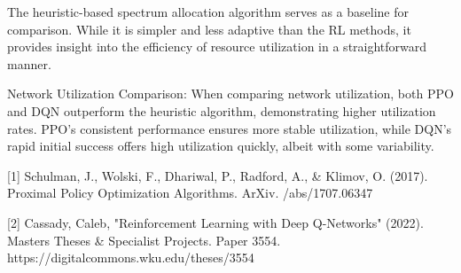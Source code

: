 \documentclass[conference]{IEEEtran}
\begin{document}
The heuristic-based spectrum allocation algorithm serves as a baseline for comparison. While it is simpler and less adaptive than the RL methods, it provides insight into the efficiency of resource utilization in a straightforward manner.

Network Utilization Comparison: When comparing network utilization, both PPO and DQN outperform the heuristic algorithm, demonstrating higher utilization rates. PPO’s consistent performance ensures more stable utilization, while DQN’s rapid initial success offers high utilization quickly, albeit with some variability.




[1] Schulman, J., Wolski, F., Dhariwal, P., Radford, A., & Klimov, O. (2017). Proximal Policy Optimization Algorithms. ArXiv. /abs/1707.06347

[2] Cassady, Caleb, "Reinforcement Learning with Deep Q-Networks" (2022). Masters Theses & Specialist Projects. Paper 3554.
https://digitalcommons.wku.edu/theses/3554
\end{document}
